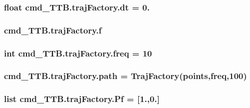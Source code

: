 \subsubsection[{\texorpdfstring{dt}{dt}}]{\setlength{\rightskip}{0pt plus 5cm}float cmd\+\_\+\+T\+T\+B.\+traj\+Factory.\+dt = 0.}\hypertarget{namespacecmd__TTB_1_1trajFactory_a40f972381ea23fa3614767994e20909e}{}\label{namespacecmd__TTB_1_1trajFactory_a40f972381ea23fa3614767994e20909e}
\subsubsection[{\texorpdfstring{f}{f}}]{\setlength{\rightskip}{0pt plus 5cm}cmd\+\_\+\+T\+T\+B.\+traj\+Factory.\+f}\hypertarget{namespacecmd__TTB_1_1trajFactory_a4eb9c241c592b3fbf3c824c82e0397d4}{}\label{namespacecmd__TTB_1_1trajFactory_a4eb9c241c592b3fbf3c824c82e0397d4}
\subsubsection[{\texorpdfstring{freq}{freq}}]{\setlength{\rightskip}{0pt plus 5cm}int cmd\+\_\+\+T\+T\+B.\+traj\+Factory.\+freq = 10}\hypertarget{namespacecmd__TTB_1_1trajFactory_abb2e2587a58c4fc35dd18e79526c3a67}{}\label{namespacecmd__TTB_1_1trajFactory_abb2e2587a58c4fc35dd18e79526c3a67}
\subsubsection[{\texorpdfstring{path}{path}}]{\setlength{\rightskip}{0pt plus 5cm}cmd\+\_\+\+T\+T\+B.\+traj\+Factory.\+path = {\bf Traj\+Factory}({\bf points},{\bf freq},100)}\hypertarget{namespacecmd__TTB_1_1trajFactory_a377dd717e6d99f94f3bd8359315ce8f2}{}\label{namespacecmd__TTB_1_1trajFactory_a377dd717e6d99f94f3bd8359315ce8f2}
\subsubsection[{\texorpdfstring{Pf}{Pf}}]{\setlength{\rightskip}{0pt plus 5cm}list cmd\+\_\+\+T\+T\+B.\+traj\+Factory.\+Pf = \mbox{[}1.,0.\mbox{]}}\hypertarget{namespacecmd__TTB_1_1trajFactory_aa5408e0df737a89e02b70bae38dabdf5}{}\label{namespacecmd__TTB_1_1trajFactory_aa5408e0df737a89e02b70bae38dabdf5}
